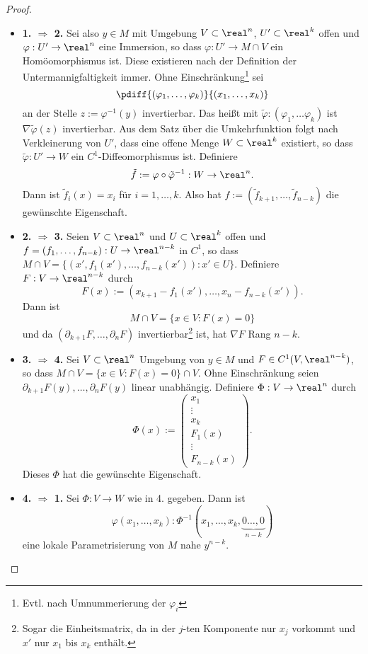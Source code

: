 \documentclass[
 a4paper,
 12pt,
 parskip=half
 ]{scrartcl}
\theoremstyle{plain}
\theoremstyle{definition}
\numberwithin{equation}{section}
\begin{document}
\begin{proof}
 \begin{itemize}
  \item \textbf{1. $\Rightarrow$ 2.} Sei also $y \in M$ mit Umgebung $V \subset \real^n$, $U' \subset \real^k$ offen und $\varphi: U' \to \real^n$ eine Immersion, so dass $\varphi: U' \to M \cap V$ ein Homöomorphismus ist. Diese existieren nach der Definition der Untermannigfaltigkeit immer. Ohne Einschränkung\footnote{Evtl. nach Umnummerierung der $\varphi_i$} sei
  \[ \pdiff{ (\varphi_1, \ldots, \varphi_k) }{ (x_1, \ldots, x_k) } \]
  an der Stelle $z := \varphi^{-1}(y)$ invertierbar. Das heißt mit $\tilde{\varphi}:( \varphi_1, \ldots \varphi_k)$ ist $\nabla \tilde{\varphi}(z)$ invertierbar. Aus dem Satz über die Umkehrfunktion folgt nach Verkleinerung von $U'$, dass eine offene Menge $W \subset \real^k$ existiert, so dass $\tilde{\varphi}: U' \to W$ ein $C^1$-Diffeomorphismus ist. Definiere
  \[ \tilde{f} :=\varphi \circ \tilde{\varphi}^{-1} : W \to \real^n. \]
  Dann ist $\tilde{f}_i(x) = x_i$ für $i = 1, \ldots, k$. Also hat $f := (\tilde{f}_{k+1}, \ldots, \tilde{f}_{n-k})$ die gewünschte Eigenschaft.
  \item \textbf{2. $\Rightarrow$ 3.} Seien $V \subset \real^n$ und $U \subset \real^k$ offen und $f = (f_1, \ldots, f_{n-k}): U \to \real^{n-k}$ in $C^1$, so dass $M \cap V = \{ (x', f_1(x'), \ldots, f_{n-k}(x') ) : x' \in U \}$. Definiere $F: V \to \real^{n-k}$ durch 
  \[ F(x) := ( x_{k+1} - f_1(x'), \ldots, x_n - f_{n-k}(x') ). \]
  Dann ist 
  \[ M \cap V = \{ x \in V : F(x) = 0 \} \]
  und da $(\partial_{k+1} F, \ldots, \partial_n F)$ invertierbar\footnote{Sogar die Einheitsmatrix, da in der $j$-ten Komponente nur $x_j$ vorkommt und $x'$ nur $x_1$ bis $x_k$ enthält.} ist, hat $\nabla F$ Rang $n-k$.
  \item \textbf{3. $\Rightarrow$ 4.} Sei $V \subset \real^n$ Umgebung von $y \in M$ und $F \in C^1(V, \real^{n-k})$, so dass $M \cap V = \{ x \in V : F(x)=0 \} \cap V$. Ohne Einschränkung seien $\partial_{k+1} F(y), \ldots, \partial_n F(y)$ linear unabhängig. Definiere $\Phi: V \to \real^n$ durch
  \[ \Phi(x) := \begin{pmatrix} x_1 \\ \vdots \\ x_k \\ F_1(x) \\ \vdots \\ F_{n-k}(x) \end{pmatrix}. \]
  Dieses $\Phi$ hat die gewünschte Eigenschaft.
  \item \textbf{4. $\Rightarrow$ 1.} Sei $\Phi: V \to W$ wie in 4. gegeben. Dann ist
  \[ \varphi(x_1, \ldots, x_k) : \Phi^{-1}( x_1, \ldots, x_k, \underbrace{0 \ldots, 0}_{n-k} ) \]
  eine lokale Parametrisierung von $M$ nahe $y^{n-k}$. \qedhere
 \end{itemize}

\end{proof}
\end{document}
